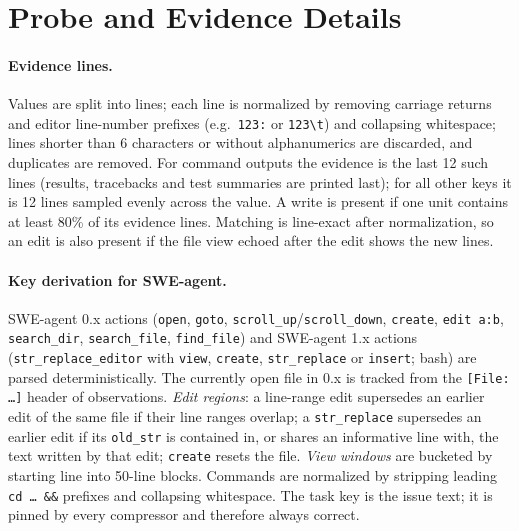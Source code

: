 \section{Probe and Evidence Details}
\label{app:probes}

\paragraph{Evidence lines.} Values are split into lines; each line is
normalized by removing carriage returns and editor line-number prefixes
(e.g.\ \texttt{123:} or \texttt{\phantom{0}123\textbackslash t}) and collapsing
whitespace; lines shorter than 6 characters or without alphanumerics are
discarded, and duplicates are removed. For command outputs the evidence is the
last 12 such lines (results, tracebacks and test summaries are printed last);
for all other keys it is 12 lines sampled evenly across the value. A write is
present if one unit contains at least 80\% of its evidence lines. Matching is
line-exact after normalization, so an edit is also present if the file view
echoed after the edit shows the new lines.

\paragraph{Key derivation for SWE-agent.} SWE-agent 0.x actions
(\texttt{open}, \texttt{goto}, \texttt{scroll\_up}/\texttt{scroll\_down},
\texttt{create}, \texttt{edit~a:b}, \texttt{search\_dir},
\texttt{search\_file}, \texttt{find\_file}) and SWE-agent 1.x actions
(\texttt{str\_replace\_editor} with \texttt{view}, \texttt{create},
\texttt{str\_replace} or \texttt{insert}; bash) are parsed
deterministically. The currently open file in 0.x is tracked from the
\texttt{[File: \dots]} header of observations. \emph{Edit regions}: a line-range
edit supersedes an earlier edit of the same file if their line ranges overlap;
a \texttt{str\_replace} supersedes an earlier edit if its \texttt{old\_str} is
contained in, or shares an informative line with, the text written by that
edit; \texttt{create} resets the file. \emph{View windows} are bucketed by
starting line into 50-line blocks. Commands are normalized by stripping
leading \texttt{cd \dots\ \&\&} prefixes and collapsing whitespace. The task key
is the issue text; it is pinned by every compressor and therefore always
correct.

